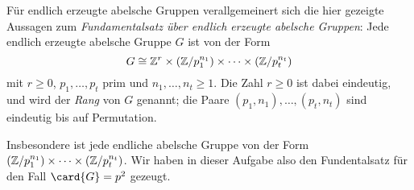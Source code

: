\begin{remark}
  Für endlich erzeugte abelsche Gruppen verallgemeinert sich die hier gezeigte Aussagen zum \emph{Fundamentalsatz über endlich erzeugte abelsche Gruppen}:
  Jede endlich erzeugte abelsche Gruppe $G$ ist von der Form
  \[
          G
    \cong \mathbb{Z}^r \times (\mathbb{Z}/p_1^{n_1}) \times \dotsb \times (\mathbb{Z}/p_t^{n_t})
  \]
  mit $r \geq 0$, $p_1, \dotsc, p_t$ prim und $n_1, \dotsc, n_t \geq 1$.
  Die Zahl $r \geq 0$ ist dabei eindeutig, und wird der \emph{Rang} von $G$ genannt;
  die Paare $(p_1, n_1), \dotsc, (p_t, n_t)$ sind eindeutig bis auf Permutation.
  
  Insbesondere ist jede endliche abelsche Gruppe von der Form $(\mathbb{Z}/p_1^{n_1}) \times \dotsb \times (\mathbb{Z}/p_t^{n_t})$.
  Wir haben in dieser Aufgabe also den Fundentalsatz für den Fall $\card{G} = p^2$ gezeugt.
\end{remark}





\subsection{}

